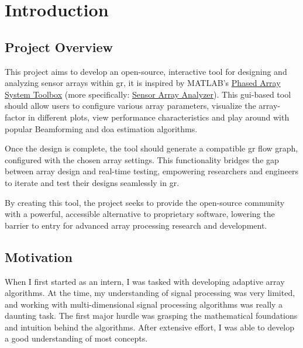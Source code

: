 \chapter{Introduction} \label{ch: introduction}

\section{Project Overview}

This project aims to develop an open-source, interactive tool for designing and analyzing sensor arrays within \acf{gr}, it is inspired by MATLAB’s \href{https://in.mathworks.com/products/phased-array.html}{Phased Array System Toolbox} (more specifically: \href{https://in.mathworks.com/help/phased/ref/sensorarrayanalyzer-app.html}{Sensor Array Analyzer}). This \acs{gui}-based tool should allow users to configure various array parameters, visualize the array-factor in different plots, view performance characteristics and play around with popular Beamforming and \acf{doa} estimation algorithms.

Once the design is complete, the tool should generate a compatible \ac{gr} flow graph, configured with the chosen array settings. This functionality bridges the gap between array design and real-time testing, empowering researchers and engineers to iterate and test their designs seamlessly in \ac{gr}.

By creating this tool, the project seeks to provide the open-source community with a powerful, accessible alternative to proprietary software, lowering the barrier to entry for advanced array processing research and development.
	
\section{Motivation}

When I first started as an intern, I was tasked with developing adaptive array algorithms. At the time, my understanding of signal processing was very limited, and working with multi-dimensional signal processing algorithms was really a daunting task. The first major hurdle was grasping the mathematical foundations and intuition behind the algorithms. After extensive effort, I was able to develop a good understanding of most concepts.

